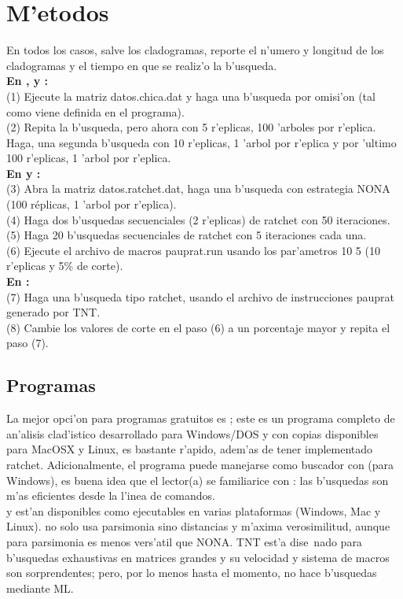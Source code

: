 \section{M'etodos}
\noindent
En todos los casos, salve los cladogramas, reporte el n'umero y longitud de los cladogramas y el tiempo en que se realiz'o la b'usqueda.\\
\textbf{En ,  y :}\\
(1) Ejecute la matriz datos.chica.dat y haga una b'usqueda por omisi'on (tal como viene definida en el programa).\\
(2) Repita la b'usqueda, pero ahora con 5 r'eplicas, 100 'arboles por r'eplica. Haga, una segunda b'usqueda con 10 r'eplicas, 1 'arbol por r'eplica y por 'ultimo 100 r'eplicas, 1 'arbol por r'eplica.\\
\textbf{En  y :}\\
(3) Abra la matriz datos.ratchet.dat, haga una b'usqueda con estrategia NONA (100 r\'eplicas, 1 'arbol por r'eplica).\\
(4) Haga dos b'usquedas secuenciales (2 r'eplicas) de ratchet con 50 iteraciones.\\
(5) Haga 20 b'usquedas secuenciales de ratchet con 5 iteraciones cada una.\\
(6) Ejecute el archivo de macros pauprat.run usando los par'ametros 10 5 (10 r'eplicas y 5\% de corte).
\\
\textbf{En :}\\
(7) Haga una b'usqueda tipo ratchet, usando el archivo de instrucciones pauprat generado por TNT.\\
(8) Cambie los valores de corte en el paso (6) a un porcentaje mayor y repita el paso (7).
\subsection{Programas}
\noindent
La mejor opci'on para programas gratuitos es ; este es un programa completo de an'alisis clad'istico desarrollado para Windows/DOS y con copias disponibles para MacOSX y Linux,  es bastante r'apido, adem'as de tener implementado ratchet. Adicionalmente, el programa puede manejarse como buscador con  (para Windows), es buena idea que el lector(a) se familiarice con : las b'usquedas son m'as eficientes desde la l'inea de comandos.\\
 y  est'an disponibles como ejecutables en varias plataformas (Windows, Mac y Linux).  no solo usa parsimonia sino distancias y m'axima verosimilitud, aunque para parsimonia es menos vers'atil que NONA. TNT est'a dise~nado para b'usquedas exhaustivas en matrices grandes y su velocidad y sistema de macros son sorprendentes; pero, por lo menos hasta el momento, no hace b'usquedas mediante ML.
